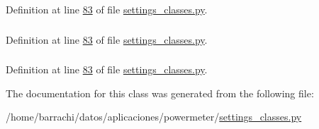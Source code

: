 \-Definition at line \hyperlink{settings__classes_8py_source_l00083}{83} of file \hyperlink{settings__classes_8py_source}{settings\-\_\-classes.\-py}.

\hypertarget{classsettings__classes_1_1_p_d_u_line_ab74e6bf80237ddc4109968cedc58c151}{
\subsubsection[{name}]{}}\label{classsettings__classes_1_1_p_d_u_line_ab74e6bf80237ddc4109968cedc58c151}


\-Definition at line \hyperlink{settings__classes_8py_source_l00083}{83} of file \hyperlink{settings__classes_8py_source}{settings\-\_\-classes.\-py}.

\hypertarget{classsettings__classes_1_1_p_d_u_line_aa1a8261d8fb901476651f1666f993d4b}{
\subsubsection[{voltage}]{}}\label{classsettings__classes_1_1_p_d_u_line_aa1a8261d8fb901476651f1666f993d4b}


\-Definition at line \hyperlink{settings__classes_8py_source_l00083}{83} of file \hyperlink{settings__classes_8py_source}{settings\-\_\-classes.\-py}.



\-The documentation for this class was generated from the following file\-:\begin{DoxyCompactItemize}
\item 
/home/barrachi/datos/aplicaciones/powermeter/\hyperlink{settings__classes_8py}{settings\-\_\-classes.\-py}\end{DoxyCompactItemize}
